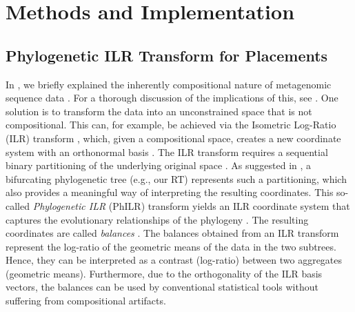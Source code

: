 
\section{Methods and Implementation}
\label{ch:Balances:sec:Methods}


\subsection{Phylogenetic ILR Transform for Placements}
\label{ch:Balances:sec:Methods:sub:ILRTransform}

In , 
we briefly explained the inherently compositional nature of metagenomic sequence data \cite{Gloor2017}.
For a thorough discussion of the implications of this, see \cite{Silverman2017}.
One solution is to transform the data into an unconstrained space that is not compositional.
This can, for example, be achieved via the Isometric Log-Ratio (ILR) transform \cite{Egozcue2003},
which, given a compositional space, creates a new coordinate system with an orthonormal basis \cite{Egozcue2005}.
The ILR transform requires a sequential binary partitioning of the underlying original space \cite{Pawlowsky-Glahn2015}.
As suggested in \cite{Silverman2017},
a bifurcating phylogenetic tree (e.g., our \ac{RT}) represents such a partitioning,
which also provides a meaningful way of interpreting the resulting coordinates.
This so-called \emph{Phylogenetic ILR} (PhILR) transform yields an ILR coordinate system
that captures the evolutionary relationships of the phylogeny \cite{Silverman2017}.
The resulting coordinates are called \emph{balances} \cite{Egozcue2003,Egozcue2005}.
The balances obtained from an ILR transform represent the log-ratio of the geometric means of the data in the two subtrees.
Hence, they can be interpreted as a contrast (log-ratio) between two aggregates (geometric means).
Furthermore, due to the orthogonality of the ILR basis vectors,
the balances can be used by conventional statistical tools without suffering from compositional artifacts.

